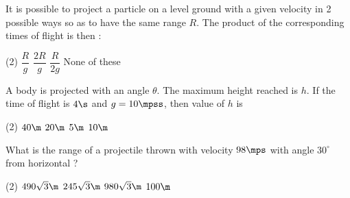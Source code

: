 \item It is possible to project a particle on a level ground with a given velocity in 2 possible ways so as to have the same range $R$. The product of the corresponding times of flight is then :
\begin{tasks}(2)
\task $\dfrac{R}{g}$
\task $\dfrac{2R}{g}$\ans
\task $\dfrac{R}{2g}$
\task None of these
\end{tasks}

\item A body is projected with an angle $\theta$. The maximum height reached is $h$. If the time of flight is $4\s$ and $g=10\mpss$, then value of $h$ is
\begin{center}
\end{center}
\vspace*{-30mm}
\begin{tasks}(2)
    \task $40\m$
    \task $20\m$\ans
    \task $5\m$
    \task $10\m$
\end{tasks}


\item What is the range of a projectile thrown with velocity $98\mps$ with angle $30^\circ$ from horizontal ?
\begin{tasks}(2)
    \task $490\sqrt{3}\m$\ans
    \task $245\sqrt{3}\m$
    \task $980\sqrt{3}\m$
    \task $100\m$
\end{tasks}

